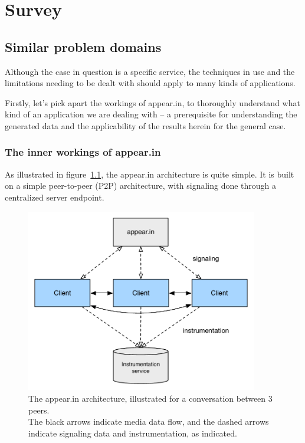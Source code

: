 \chapter{Survey}

\label{Chapter2}


\section{Similar problem domains} %
\label{survey:sec:similar_problem_domains}

Although the case in question is a specific service, the techniques in use and the limitations needing to be dealt with should apply to many kinds of applications.

Firstly, let's pick apart the workings of appear.in, to thoroughly understand what kind of an application we are dealing with -- a prerequisite for understanding the generated data and the applicability of the results herein for the general case.

\subsection{The inner workings of appear.in}
\label{survey:sub:appearin}

As illustrated in figure~\ref{fig:appearin-arch}, the appear.in architecture is quite simple. It is built on a simple peer-to-peer (P2P) architecture, with signaling done through a centralized server endpoint.

\begin{figure}[h]
  \centering
    \includegraphics[width=0.9\textwidth]{Figures/appearin-arch}
    \caption{The appear.in architecture, illustrated for a conversation between 3 peers. \\ The black arrows indicate media data flow, and the dashed arrows indicate signaling data and instrumentation, as indicated.}
    \label{fig:appearin-arch}
\end{figure}

